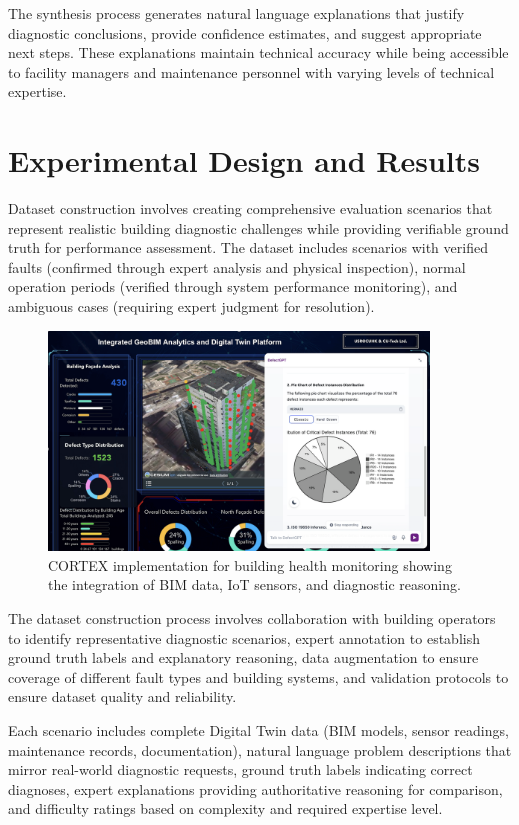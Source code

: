 The synthesis process generates natural language explanations that justify diagnostic conclusions, provide confidence estimates, and suggest appropriate next steps. These explanations maintain technical accuracy while being accessible to facility managers and maintenance personnel with varying levels of technical expertise.

\section{Experimental Design and Results}

Dataset construction involves creating comprehensive evaluation scenarios that represent realistic building diagnostic challenges while providing verifiable ground truth for performance assessment. The dataset includes scenarios with verified faults (confirmed through expert analysis and physical inspection), normal operation periods (verified through system performance monitoring), and ambiguous cases (requiring expert judgment for resolution).

\begin{figure}[htbp]
\centering
\includegraphics[width=0.9\textwidth]{figures/DefectGPT/System_implement.png}
\caption{CORTEX implementation for building health monitoring showing the integration of BIM data, IoT sensors, and diagnostic reasoning.}
\label{fig:system_implementation}
\end{figure}

The dataset construction process involves collaboration with building operators to identify representative diagnostic scenarios, expert annotation to establish ground truth labels and explanatory reasoning, data augmentation to ensure coverage of different fault types and building systems, and validation protocols to ensure dataset quality and reliability.

Each scenario includes complete Digital Twin data (BIM models, sensor readings, maintenance records, documentation), natural language problem descriptions that mirror real-world diagnostic requests, ground truth labels indicating correct diagnoses, expert explanations providing authoritative reasoning for comparison, and difficulty ratings based on complexity and required expertise level.

